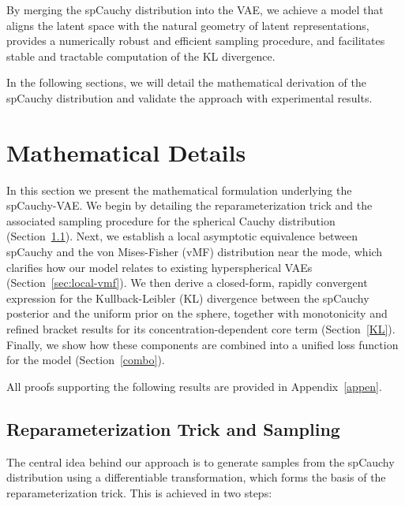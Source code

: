 \documentclass{article}
\begin{document}
By merging the spCauchy distribution into the VAE, we achieve a model that aligns the latent space with the natural geometry of latent representations, provides a numerically robust and efficient sampling procedure, and facilitates stable and tractable computation of the KL divergence.

In the following sections, we will detail the mathematical derivation of the spCauchy distribution and validate the approach with experimental results.

\section{Mathematical Details}

In this section we present the mathematical formulation underlying the spCauchy-VAE. We begin by detailing the reparameterization trick and the associated sampling procedure for the spherical Cauchy distribution (Section~\ref{repar}). Next, we establish a local asymptotic equivalence between spCauchy and the von Mises-Fisher (vMF) distribution near the mode, which clarifies how our model relates to existing hyperspherical VAEs (Section~\ref{sec:local-vmf}). We then derive a closed-form, rapidly convergent expression for the Kullback-Leibler (KL) divergence between the spCauchy posterior and the uniform prior on the sphere, together with monotonicity and refined bracket results for its concentration-dependent core term (Section~\ref{KL}). Finally, we show how these components are combined into a unified loss function for the model (Section~\ref{combo}).

All proofs supporting the following results are provided in Appendix~\ref{appen}.

\subsection{Reparameterization Trick and Sampling}\label{repar}

The central idea behind our approach is to generate samples from the spCauchy distribution using a differentiable transformation, which forms the basis of the reparameterization trick. This is achieved in two steps:
\end{document}

